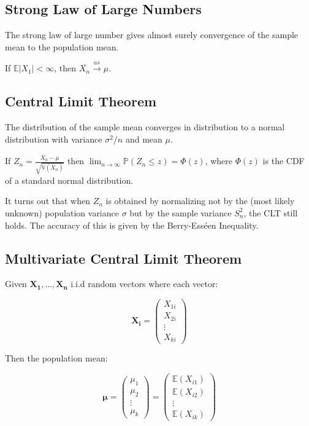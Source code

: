 \subsection{Strong Law of Large Numbers}
The strong law of large number gives almost surely convergence of the sample mean to the population mean.

If $\mathbb{E}|X_1| < \infty$, then $\overline{X_n}\xrightarrow{as}\mu$.



\subsection{Central Limit Theorem}
The distribution of the sample mean converges in distribution to a normal distribution with variance $\sigma^2/n$ and mean $\mu$.

If $Z_n = \frac{\overline{X}_n - \mu}{\sqrt{\mathbb{V}(\overline{X}_n)}}$ then $\lim_{n\rightarrow \infty} \mathbb{P}(Z_n \leq z) = \Phi(z)$, where $\Phi(z)$ is the CDF of a standard normal distribution. 

It turns out that when $Z_n$ is obtained by normalizing not by the (most likely unknown) population variance $\sigma$ but by the sample variance $S_n^2$, the CLT still holds. The accuracy of this is given by the Berry-Ess\'een Inequality.


\subsection{Multivariate Central Limit Theorem}
Given $\mathbf{X_1, ... ,X_n}$ i.i.d random vectors where each vector:

\begin{equation}
\mathbf{X_i} = \left(\begin{array}{c}X_{1i}\\ X_{2i} \\ \vdots \\ X_{ki} \end{array}\right)
\end{equation}

Then the population mean:

\begin{equation}
\mathbf{\mu} = \left(\begin{array}{c} \mu_1 \\ \mu_2 \\ \vdots \\ \mu_k \end{array} \right) =  \left(\begin{array}{c} \mathbb{E}(X_{i1}) \\ \mathbb{E}(X_{i2}) \\ \vdots \\ \mathbb{E}(X_{ik}) \end{array} \right)
\end{equation}


